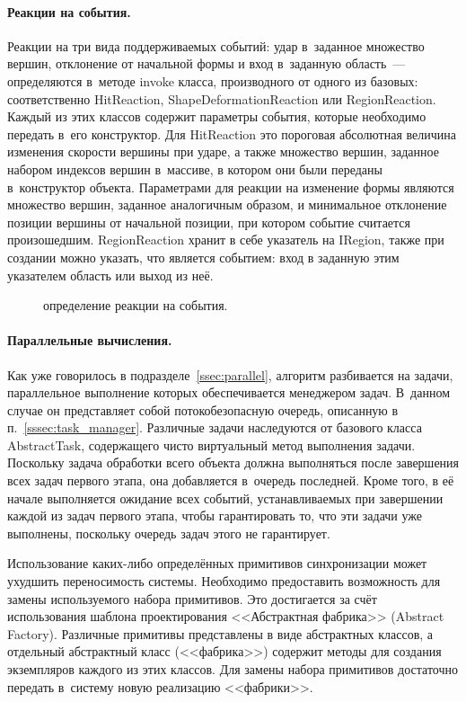 \documentclass[a4paper, 14pt, titlepage]{extarticle}
\newcommand{\eng}[1]{{\English #1}}
\newcommand{\includefigure}[3][]{
    \begin{figure}[!htb]
      \center{\texttt{[image: \#2]}}
      \caption{#3} \label{fig:#2}
    \end{figure}
  }
\begin{document}
        \paragraph{Реакции на события.}
        Реакции на три вида поддерживаемых событий: удар в~заданное множество вершин, отклонение от
        начальной формы и вход в~заданную область~--- определяются в~методе invoke класса,
        производного от одного из базовых: соответственно HitReaction, ShapeDeformationReaction или RegionReaction.
        Каждый из этих классов содержит параметры события, которые
        необходимо передать в~его конструктор. Для HitReaction это пороговая абсолютная величина
        изменения скорости вершины при ударе, а также множество вершин, заданное набором индексов вершин
        в~массиве, в котором они были переданы в~конструктор объекта. Параметрами для
        реакции на изменение формы являются множество вершин, заданное аналогичным образом, и минимальное
        отклонение позиции вершины от начальной позиции, при котором событие считается произошедшим.
        RegionReaction хранит в себе указатель на IRegion, также при создании можно указать, что
        является событием: вход в заданную этим указателем область или выход из неё.

        \includefigure{core-reactions}{определение реакции на события.}

        \paragraph{Параллельные вычисления.}
        Как уже говорилось в подразделе~\ref{ssec:parallel}, алгоритм разбивается на задачи, параллельное
        выполнение которых обеспечивается менеджером задач. В~данном случае он представляет собой
        потокобезопасную очередь, описанную в п.~\ref{sssec:task_manager}. Различные задачи
        наследуются от базового класса AbstractTask, содержащего чисто виртуальный метод выполнения
        задачи.  Поскольку задача обработки всего объекта должна выполняться после завершения всех
        задач первого этапа, она добавляется в~очередь последней. Кроме того, в её начале
        выполняется ожидание всех событий, устанавливаемых при завершении каждой из задач первого
        этапа, чтобы гарантировать то, что эти задачи уже выполнены, поскольку очередь задач этого не гарантирует.

        Использование каких-либо определённых примитивов синхронизации может ухудшить переносимость
        системы. Необходимо предоставить возможность для замены используемого набора примитивов.
        Это достигается за счёт использования шаблона проектирования <<Абстрактная фабрика>> (\eng{Abstract
        Factory}). Различные примитивы представлены в виде абстрактных классов, а отдельный
        абстрактный класс (<<фабрика>>) содержит методы для создания экземпляров каждого из этих
        классов. Для замены набора примитивов достаточно передать в~систему новую реализацию
        <<фабрики>>.
\end{document}
